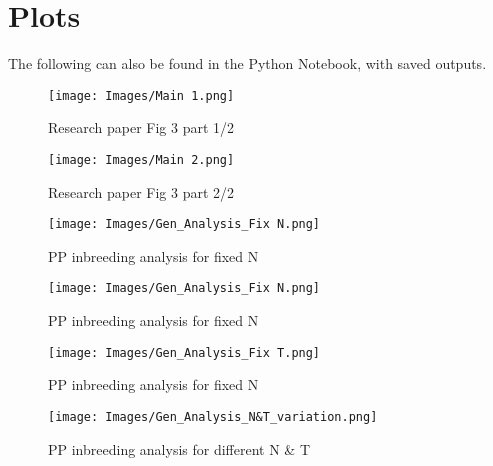 \documentclass{article}
\begin{document}
\section{Plots}
The following can also be found in the Python Notebook, with saved outputs.
\begin{figure}[htbp]
    \centering
    \texttt{[image: Images/Main 1.png]}
    \caption{Research paper Fig 3 part 1/2}
    \label{fig:my_label}
\end{figure}
\begin{figure}[htbp]
    \centering
    \texttt{[image: Images/Main 2.png]}
    \caption{Research paper Fig 3 part 2/2}
    \label{fig:my_label}
\end{figure}
\begin{figure}[htbp]
    \centering
    \texttt{[image: Images/Gen\_Analysis\_Fix N.png]}
    \caption{PP inbreeding analysis for fixed N}
    \label{fig:my_label}
\end{figure}
\begin{figure}[htbp]
    \centering
    \texttt{[image: Images/Gen\_Analysis\_Fix N.png]}
    \caption{PP inbreeding analysis for fixed N}
    \label{fig:my_label}
\end{figure}
\begin{figure}[htbp]
    \centering
    \texttt{[image: Images/Gen\_Analysis\_Fix T.png]}
    \caption{PP inbreeding analysis for fixed N}
    \label{fig:my_label}
\end{figure}
\begin{figure}[htbp]
    \centering
    \texttt{[image: Images/Gen\_Analysis\_N\&T\_variation.png]}
    \caption{PP inbreeding analysis for different N \& T}
    \label{fig:my_label}
\end{figure}



\end{document}
